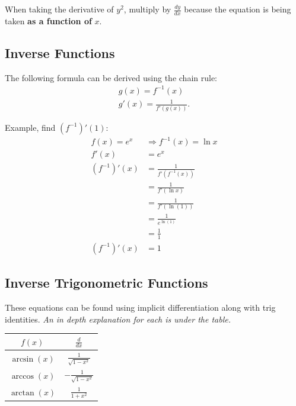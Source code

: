 \documentclass[12pt]{article}
\begin{document}
When taking the derivative of $y^2$, multiply by $\frac{dy}{dx}$ because the equation is being taken \textbf{as a function of} $x$.

\subsection{Inverse Functions}
\noindent The following formula can be derived using the chain rule:
\begin{gather*}
    g(x) = f^{-1}(x) \\
    g'(x) = \frac{1}{f'\left( g(x) \right)}.
\end{gather*}

\noindent Example, find $(f^{-1})'(1)$:
\begin{align*}
    f(x) = e^x   & \Rightarrow f^{-1}(x) = \ln{x}          \\
    f'(x)        & = e^x                                   \\
    (f^{-1})'(x) & = \frac{1}{f' \left( f^{-1}(x) \right)} \\[6pt]
                 & = \frac{1}{f'(\ln{x})}                  \\[6pt]
                 & = \frac{1}{f'(\ln{(1)})}                \\[6pt]
                 & = \frac{1}{e^{\ln{(1)}}}                \\[6pt]
                 & = \frac{1}{1}                           \\[6pt]
    (f^{-1})'(x) & = 1
\end{align*}

\subsection{Inverse Trigonometric Functions}
These equations can be found using implicit differentiation along with trig identities. \textit{An in depth explanation for each is under the table.}
\begin{center}
    \begin{tabular}{|c|c|}
        \hline
        $f(x)$       & $\frac{d}{dx}$            \\
        \hline \hline
        $\arcsin(x)$ & $\frac{1}{\sqrt{1-x^2}}$  \\
        \hline
        $\arccos(x)$ & $-\frac{1}{\sqrt{1-x^2}}$ \\
        \hline
        $\arctan(x)$ & $\frac{1}{1+x^2}$         \\
        \hline
    \end{tabular}
\end{center}
\end{document}

